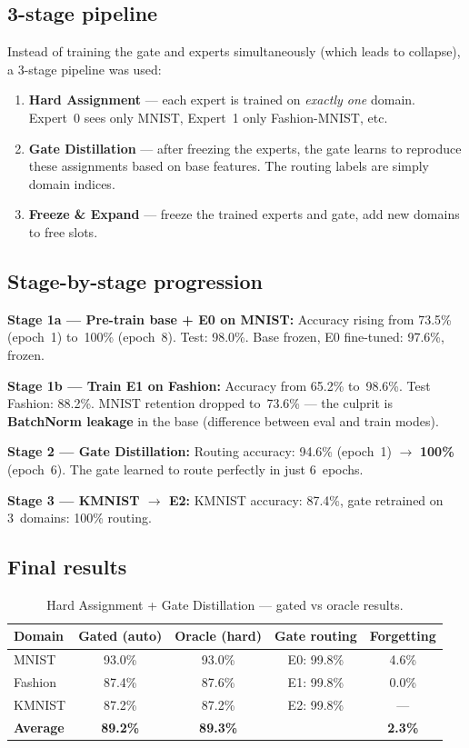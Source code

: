 \documentclass[11pt,a4paper]{report}
\begin{document}
\subsection{3-stage pipeline}

Instead of training the gate and experts simultaneously (which leads to collapse), a 3-stage pipeline was used:

\begin{enumerate}
    \item \textbf{Hard Assignment} --- each expert is trained on \emph{exactly one} domain. Expert~0 sees only MNIST, Expert~1 only Fashion-MNIST, etc.
    \item \textbf{Gate Distillation} --- after freezing the experts, the gate learns to reproduce these assignments based on base features. The routing labels are simply domain indices.
    \item \textbf{Freeze \& Expand} --- freeze the trained experts and gate, add new domains to free slots.
\end{enumerate}

\subsection{Stage-by-stage progression}

\textbf{Stage 1a --- Pre-train base + E0 on MNIST:}
Accuracy rising from 73.5\% (epoch~1) to~100\% (epoch~8). Test: 98.0\%. Base frozen, E0 fine-tuned: 97.6\%, frozen.

\textbf{Stage 1b --- Train E1 on Fashion:}
Accuracy from 65.2\% to~98.6\%. Test Fashion: 88.2\%. MNIST retention dropped to~73.6\% --- the culprit is \textbf{BatchNorm leakage} in the base (difference between eval and train modes).

\textbf{Stage 2 --- Gate Distillation:}
Routing accuracy: 94.6\% (epoch~1) $\to$ \textbf{100\%} (epoch~6). The gate learned to route perfectly in just 6~epochs.

\textbf{Stage 3 --- KMNIST $\to$ E2:}
KMNIST accuracy: 87.4\%, gate retrained on 3~domains: 100\% routing.

\subsection{Final results}

\begin{table}[h]
\centering
\caption{Hard Assignment + Gate Distillation --- gated vs oracle results.}
\begin{tabular}{l c c c c}
\hline
\textbf{Domain} & \textbf{Gated (auto)} & \textbf{Oracle (hard)} & \textbf{Gate routing} & \textbf{Forgetting} \\
\hline
MNIST & 93.0\% & 93.0\% & E0: 99.8\% & 4.6\% \\
Fashion & 87.4\% & 87.6\% & E1: 99.8\% & 0.0\% \\
KMNIST & 87.2\% & 87.2\% & E2: 99.8\% & --- \\
\textbf{Average} & \textbf{89.2\%} & \textbf{89.3\%} & & \textbf{2.3\%} \\
\hline
\end{tabular}
\end{table}
\end{document}
